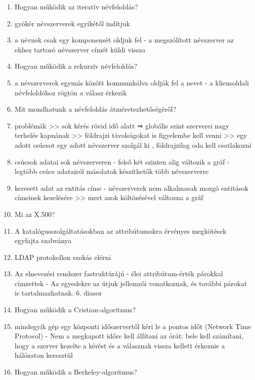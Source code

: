 \documentclass[twoside, a4paper, 12pt]{article}
\begin{document}
\begin{enumerate}
            \item  Hogyan működik az iteratív névfeloldás?
            \item gyökér névszerverek egyikétől indítjuk
            \item a névnek csak egy komponensét oldjuk fel
                - a megszólított névszerver az ehhez tartozó névszerver címét küldi vissza
            \item  Hogyan működik a rekurzív névfeloldás?
            \item a névszerverek egymás között kommunkálva oldják fel a nevet
                - a kliensoldali névfeloldóhoz rögtön a válasz érkezik
            \item  Mit mondhatunk a névfeloldás átméretezhetőségéről?
            \item problémák 
                >> sok kérés rövid idő alatt ⇒ globális szint szerverei nagy terhelés kapnának
                >> földrajzi távolságokat is figyelembe kell venni
                >> egy adott csúcsot egy adott névszerver szolgál ki , földrajzilag oda kell csatlakozni
            \item csúcsok adatai sok névszerveren
                - felső két szinten alig változik a gráf
                - legtöbb csúcs adatairól másolatok készíthetők több névszerverre
            \item keresett adat az entitás címe
                - névszerverek nem alkalmasak mozgó entitások címeinek kezelésére >>  mert azok költözésével változna a gráf
            \item  Mi az X.500?
            \item A katalógusszolgáltatásokban az attribútumokra érvényes megkötések egyfajta szabványa
            \item LDAP protokollon szokás elérni 
            \item Az elnevezési rendszer fastruktúrájú
                - élei attribútum-érték párokkal címzettek
                - Az egyedekre az útjuk jellemzői vonatkoznak, és további párokat is tartalmazhatnak.
                6. diasor
            \item  Hogyan működik a Cristian-algoritmus?
            \item mindegyik gép egy központi időszervertől kéri le a pontos időt (Network Time Protocol)	
                - Nem a megkapott időre kell állítani az órát: bele kell számítani, hogy 
                a szerver kezelte a kérést és a válasznak vissza kellett érkeznie a hálózaton keresztül
            \item  Hogyan működik a Berkeley-algoritmus?

\end{enumerate}
\end{document}
